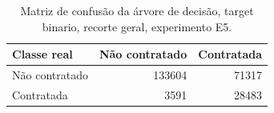 \begin{table}
\caption{Matriz de confusão da árvore de decisão, target binario, recorte geral, experimento E5.}
\label{tab:matriz_confusao_treeClassification_10_profundidade_binario_recorte_geral_holdout_80_20_e5}
\begin{tabular}{lrr}
\toprule
Classe real & Não contratado & Contratada \\
\midrule
Não contratado & 133604 & 71317 \\
Contratada & 3591 & 28483 \\
\bottomrule
\end{tabular}
\end{table}
